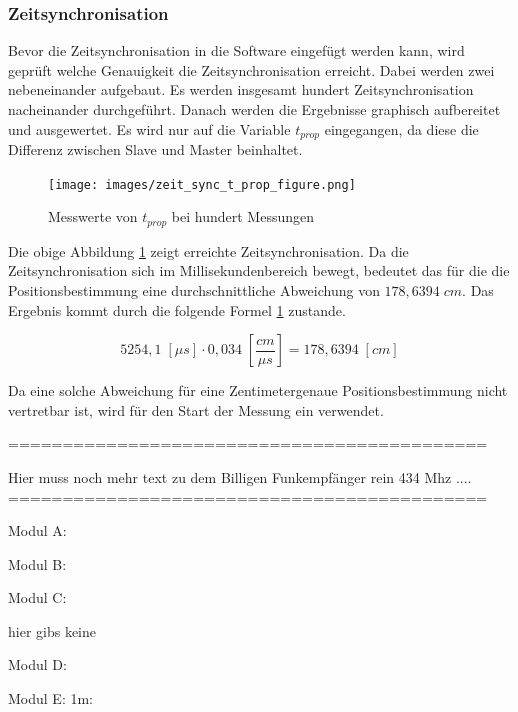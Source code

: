 \subsubsection{Zeitsynchronisation}
Bevor die Zeitsynchronisation in die Software eingefügt werden kann, wird geprüft welche Genauigkeit die Zeitsynchronisation erreicht. Dabei werden zwei \board \platz nebeneinander aufgebaut. Es werden insgesamt hundert Zeitsynchronisation nacheinander durchgeführt. Danach werden die Ergebnisse graphisch aufbereitet und ausgewertet. Es wird nur auf die Variable $t_{prop}$ eingegangen, da diese die Differenz zwischen Slave und Master beinhaltet. 
\begin{figure}[H]
        \centering
        \hspace*{-1.7cm}
        \texttt{[image: images/zeit\_sync\_t\_prop\_figure.png]}
        \caption{Messwerte von $t_{prop}$ bei hundert Messungen}
        \label{img:zeit_sync_t_prop_figure}
\end{figure}
Die obige Abbildung \ref{img:zeit_sync_t_prop_figure} zeigt erreichte Zeitsynchronisation. Da die Zeitsynchronisation sich im Millisekundenbereich bewegt, bedeutet das für die die Positionsbestimmung eine durchschnittliche Abweichung von $178,6394 \;cm$. Das Ergebnis kommt durch die folgende Formel \ref{img:zeit_sync_t_prop_figure} zustande.

\begin{equation}\label{eq:durchschnittsabweichung_t_prop}
5254,1 \;[\mu s] \cdot 0,034 \; [\frac{cm}{\mu s}] = 178,6394 \;[cm]
\end{equation}

Da eine solche Abweichung für eine Zentimetergenaue Positionsbestimmung nicht vertretbar ist, wird für den Start der Messung ein \funkempfaenger \platz verwendet.

============================================

Hier muss noch mehr text zu dem Billigen Funkempfänger rein 434 Mhz ....
\\
============================================

Modul A:




Modul B:


Modul C:

hier gibs keine


Modul D:



Modul E: 1m:

